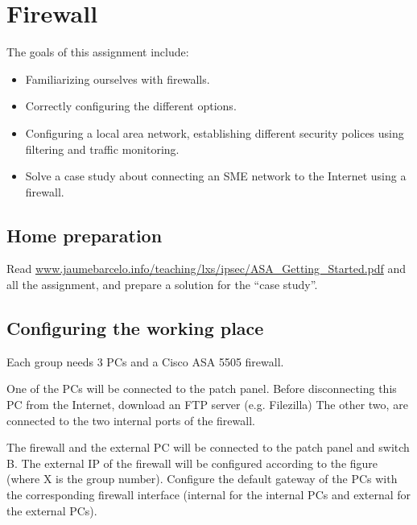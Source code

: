 \chapter{Firewall}

The goals of this assignment include:
\begin{itemize}
\item Familiarizing ourselves with firewalls.
\item Correctly configuring the different options.
\item Configuring a local area network, establishing different security polices using filtering and traffic monitoring.
\item Solve a case study about connecting an SME network to the Internet using a firewall.
\end{itemize}

\section{Home preparation}
Read
\url{www.jaumebarcelo.info/teaching/lxs/ipsec/ASA_Getting_Started.pdf}
and all the assignment, and prepare a solution for the ``case study''.

\section{Configuring the working place}
Each group needs 3 PCs and a Cisco ASA 5505 firewall.

One of the PCs will be connected to the patch panel.
Before disconnecting this PC from the Internet, download an FTP server (e.g. Filezilla)
The other two, are connected to the two internal ports of the firewall.

The firewall and the external PC will be connected to the patch panel and switch B.
The external IP of the firewall will be configured according to the figure (where X is the group number).
Configure the default gateway of the PCs with the corresponding firewall interface (internal for the internal PCs and external for the external PCs).

